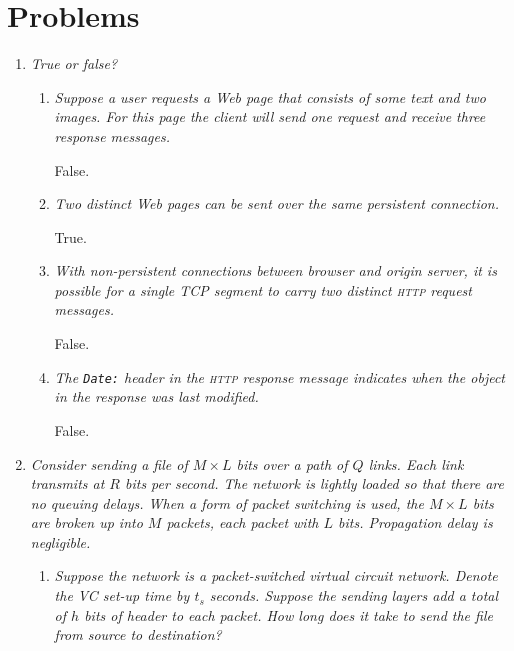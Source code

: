 \section{Problems}

\begin{enumerate}

  \item \emph{True or false?}
  \begin{enumerate}

    \item \emph{Suppose a user requests a Web page that consists of
      some text and two images. For this page the client will send one
      request and receive three response messages.}

     False.

    \item \emph{Two distinct Web pages can be sent over the same
      persistent connection.}

    True.

    \item \emph{With non-persistent connections between browser and
      origin ser\-ver, it is possible for a single TCP segment to
      carry two distinct \textsc{http} request messages.}

    False.

    \item \emph{The \texttt{Date:} header in the \textsc{http} response
      message indicates when the object in the response was last
      modified.}

    False.

  \end{enumerate}

  \item \emph{Consider sending a file of \(M \times L\) bits over a
    path of \(Q\) links. Each link transmits at \(R\) bits per
    second. The network is lightly loaded so that there are no queuing
    delays. When a form of packet switching is used, the \(M \times
    L\) bits are broken up into \(M\) packets, each packet with \(L\)
    bits. Propagation delay is negligible.}
    \begin{enumerate}

      \item \emph{Suppose the network is a packet-switched virtual
        circuit network. Denote the VC set-up time by \(t_s\)
        seconds. Suppose the sending layers add a total of \(h\) bits
        of header to each packet. How long does it take to send the
        file from source to destination?}


\end{enumerate}
\end{enumerate}

